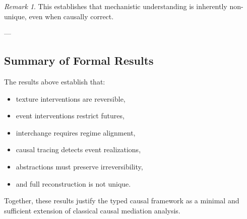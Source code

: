 \documentclass[11pt]{article}
\theoremstyle{remark}
\newtheorem{remark}{Remark}
\begin{document}
\begin{remark}
This establishes that mechanistic understanding is inherently non-unique,
even when causally correct.
\end{remark}

---

\subsection{Summary of Formal Results}

The results above establish that:
\begin{itemize}
\item texture interventions are reversible,
\item event interventions restrict futures,
\item interchange requires regime alignment,
\item causal tracing detects event realizations,
\item abstractions must preserve irreversibility,
\item and full reconstruction is not unique.
\end{itemize}

Together, these results justify the typed causal framework
as a minimal and sufficient extension of classical causal mediation analysis.
\end{document}
